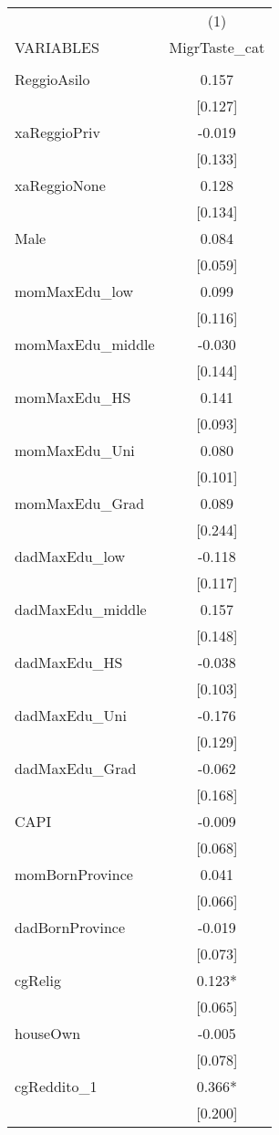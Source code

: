 \documentclass[]{article}
\begin{document}
\begin{tabular}{lc} \hline
 & (1) \\
VARIABLES & MigrTaste\_cat \\ \hline
 &  \\
ReggioAsilo & 0.157 \\
 & [0.127] \\
xaReggioPriv & -0.019 \\
 & [0.133] \\
xaReggioNone & 0.128 \\
 & [0.134] \\
Male & 0.084 \\
 & [0.059] \\
momMaxEdu\_low & 0.099 \\
 & [0.116] \\
momMaxEdu\_middle & -0.030 \\
 & [0.144] \\
momMaxEdu\_HS & 0.141 \\
 & [0.093] \\
momMaxEdu\_Uni & 0.080 \\
 & [0.101] \\
momMaxEdu\_Grad & 0.089 \\
 & [0.244] \\
dadMaxEdu\_low & -0.118 \\
 & [0.117] \\
dadMaxEdu\_middle & 0.157 \\
 & [0.148] \\
dadMaxEdu\_HS & -0.038 \\
 & [0.103] \\
dadMaxEdu\_Uni & -0.176 \\
 & [0.129] \\
dadMaxEdu\_Grad & -0.062 \\
 & [0.168] \\
CAPI & -0.009 \\
 & [0.068] \\
momBornProvince & 0.041 \\
 & [0.066] \\
dadBornProvince & -0.019 \\
 & [0.073] \\
cgRelig & 0.123* \\
 & [0.065] \\
houseOwn & -0.005 \\
 & [0.078] \\
cgReddito\_1 & 0.366* \\
 & [0.200] \\

\end{tabular}
\end{document}
